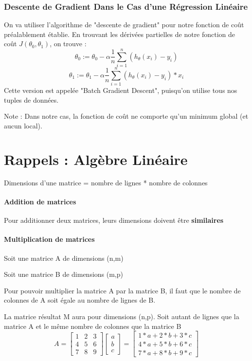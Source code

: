 \documentclass{article}
\theoremstyle{definition}
\begin{document}
\subsubsection{Descente de Gradient Dans le Cas d'une Régression Linéaire}
On va utiliser l'algorithme de "descente de gradient" pour notre fonction de coût préalablement établie. En trouvant les dérivées partielles de notre fonction de coût $J(\theta_0,\theta_1)$, on trouve :
\begin{equation} \label{eu_eqn}
\theta_0:=\theta_0 - \alpha\frac{1}{n}\sum_{i=1}^{n} (h_\theta (x_i) - y_i)
\end{equation}
\begin{equation} \label{eu_eqn}
\theta_1:=\theta_1 - \alpha\frac{1}{n}\sum_{i=1}^{n} (h_\theta (x_i) - y_i)*x_i
\end{equation}
Cette version est appelée "Batch Gradient Descent", puisqu'on utilise tous nos tuples de données.\par
Note : Dans notre cas, la fonction de coût ne comporte qu'un minimum global (et aucun local).\par
\newpage
\section{Rappels : Algèbre Linéaire}
Dimensions d'une matrice = nombre de lignes * nombre de colonnes
\paragraph{Addition de matrices}
Pour additionner deux matrices, leurs dimensions doivent être\textbf{ similaires}
\paragraph{Multiplication de matrices}
Soit une matrice A de dimensions (n,m) \par
Soit une matrice B de dimensions (m,p) \par
Pour pouvoir multiplier la matrice A par la matrice B, il faut que le nombre de colonnes de A soit égale au nombre de lignes de B.\par
La matrice résultat M aura pour dimensions (n,p). Soit autant de lignes que la matrice A et le même nombre de colonnes que la matrice B
\begin{equation}
A =
\begin{bmatrix} 
1 & 2 & 3 \\
4 & 5 & 6 \\
7 & 8 & 9
\end{bmatrix}
\begin{bmatrix} 
a\\
b \\
c
\end{bmatrix}
=
\begin{bmatrix} 
1*a + 2*b + 3*c\\
4*a + 5*b + 6*c\\
7*a + 8*b + 9*c
\end{bmatrix}
\end{equation}
\end{document}
